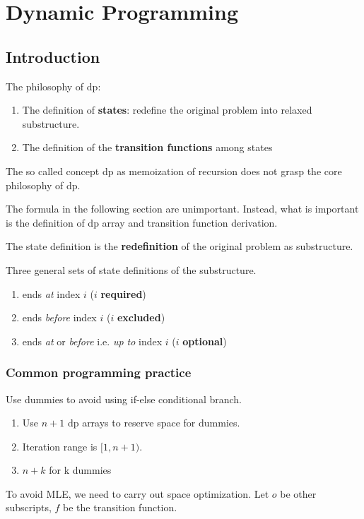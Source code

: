 \chapter{Dynamic Programming}



\section{Introduction}
The philosophy of dp:
\begin{enumerate}
\item The definition of \textbf{states}: redefine the original problem into relaxed substructure. 
\item The definition of the \textbf{transition functions} among states 
\end{enumerate} 

The so called concept dp as memoization of recursion does not grasp the core philosophy of dp. 

The formula in the following section are unimportant. Instead, what is important is the definition of dp array and transition function derivation.

 The state definition is the \textbf{redefinition} of the original problem as substructure. 

Three general sets of state definitions of the substructure. 
\begin{enumerate}
\item ends \textit{at} index $i$ ($i$ \textbf{required})
\item ends \textit{before} index $i$ ($i$ \textbf{excluded})
\item ends \textit{at} or \textit{before} i.e. \textit{up to} index $i$ ($i$ \textbf{optional})
\end{enumerate}
\subsection{Common programming practice}
 Use dummies to avoid using if-else conditional branch.
\begin{enumerate}
\item Use $n+1$ dp arrays to reserve space for dummies. 
\item Iteration range is $[1, n+1)$.
\item $n+k$ for k dummies  
\end{enumerate}


 To avoid MLE, we need to carry out space optimization. Let $o$ be other subscripts, $f$ be the transition function. 

